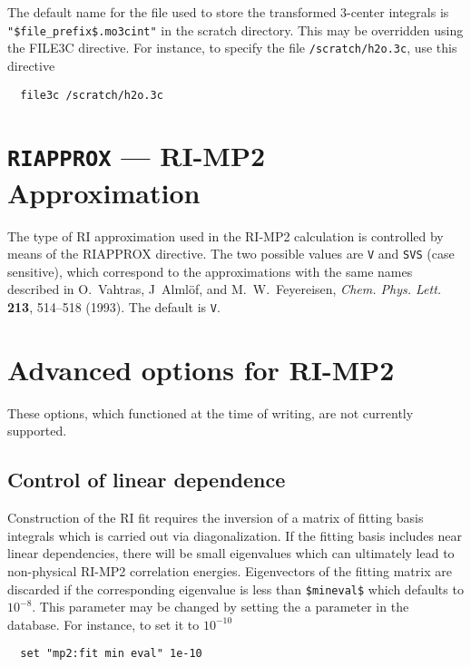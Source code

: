 \sloppy

The default name for the file used to store the transformed 3-center
integrals is \verb+"$file_prefix$.mo3cint"+ in the scratch directory.
This may be overridden using the FILE3C directive.  For instance, to
specify the file \verb+/scratch/h2o.3c+, use this directive
\begin{verbatim}
  file3c /scratch/h2o.3c
\end{verbatim}

\fussy


\section{{\tt RIAPPROX} --- RI-MP2 Approximation}

The type of RI approximation used in the RI-MP2 calculation is controlled
by means of the RIAPPROX directive.  The two possible values are
\verb+V+ and \verb+SVS+ (case sensitive), which correspond to the
approximations with the same names described in O.~Vahtras, J~Alml\"of,
and M.~W.~Feyereisen, {\em Chem. Phys. Lett.} {\bf 213}, 514--518
(1993).  The default is \verb+V+.


\section{Advanced options for RI-MP2}

These options, which functioned at the time of writing, are not
currently supported.

\subsection{Control of linear dependence}

Construction of the RI fit requires the inversion of a matrix of
fitting basis integrals which is carried out via diagonalization.  If
the fitting basis includes near linear dependencies, there will be
small eigenvalues which can ultimately lead to non-physical RI-MP2
correlation energies.  Eigenvectors of the fitting matrix 
are discarded if the corresponding eigenvalue is less than
\verb+$mineval$+ which defaults to $10^{-8}$.  This 
parameter may be changed by setting the a parameter in the database.
For instance, to set it to $10^{-10}$

\begin{verbatim}
  set "mp2:fit min eval" 1e-10
\end{verbatim}

